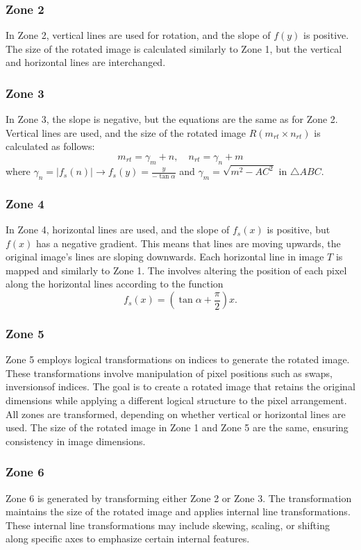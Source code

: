 \documentclass[conference]{IEEEtran}
\begin{document}
\subsubsection{Zone 2}
In Zone 2, vertical lines are used for rotation, and the slope of \( f(y) \) is positive. The size of the rotated image is calculated similarly to Zone 1, but the vertical and horizontal lines are interchanged.

\subsubsection{Zone 3}
In Zone 3, the slope is negative, but the equations are the same as for Zone 2. Vertical lines are used, and the size of the rotated image \( R (m_{rt} \times n_{rt}) \) is calculated as follows:
\[
m_{rt} = \gamma_m + n, \quad n_{rt} = \gamma_n + m
\]
where \( \gamma_n = |f_s(n)| \rightarrow f_s(y) = \frac{y}{-\tan \alpha} \) and \( \gamma_m = \sqrt{m^2 - AC^2} \) in \( \triangle ABC \).

\subsubsection{Zone 4}
In Zone 4, horizontal lines are used, and the slope of \( f_s(x) \) is positive, but \( f(x) \) has a negative gradient. This means that lines are moving upwards, the original image's lines are sloping downwards. Each horizontal line in image \( T \) is mapped and similarly to Zone 1. The involves altering the position of each pixel along the horizontal lines according to the function 
\[
f_s(x) = \left(\tan \alpha + \frac{\pi}{2}\right)x.
\]

\subsubsection{Zone 5}
Zone 5 employs logical transformations on indices to generate the rotated image. These transformations involve manipulation of pixel positions such as swaps, inversionsof indices. The goal is to create a rotated image that retains the original dimensions while applying a different logical structure to the pixel arrangement. All zones are transformed, depending on whether vertical or horizontal lines are used. The size of the rotated image in Zone 1 and Zone 5 are the same, ensuring consistency in image dimensions.

\subsubsection{Zone 6}
Zone 6 is generated by transforming either Zone 2 or Zone 3. 
The transformation maintains the size of the rotated image and applies internal line transformations. These internal line transformations may include skewing, scaling, or shifting along specific axes to emphasize certain internal features. 
\end{document}
